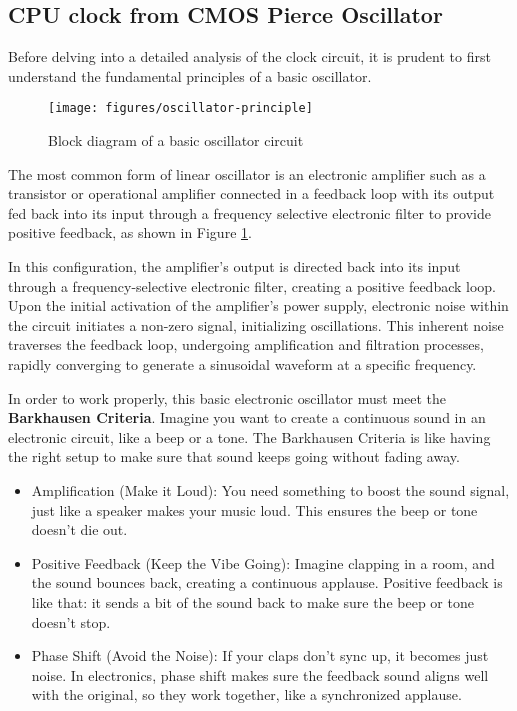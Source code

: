 \subsection{CPU clock from CMOS Pierce Oscillator}

Before delving into a detailed analysis of the clock circuit, it is prudent to first understand the fundamental principles of a basic oscillator. 

\begin{figure}[h]
  \centering
  \texttt{[image: figures/oscillator-principle]}
  \caption{Block diagram of a basic oscillator circuit}
  \label{fig:oscillator-principle}
\end{figure}

The most common form of linear oscillator is an electronic amplifier such as a transistor or operational amplifier connected in a feedback loop with its output fed back into its input through a frequency selective electronic filter to provide positive feedback, as shown in Figure \ref{fig:oscillator-principle}. 

In this configuration, the amplifier's output is directed back into its input through a frequency-selective electronic filter, creating a positive feedback loop. Upon the initial activation of the amplifier's power supply, electronic noise within the circuit initiates a non-zero signal, initializing oscillations. This inherent noise traverses the feedback loop, undergoing amplification and filtration processes, rapidly converging to generate a sinusoidal waveform at a specific frequency.

In order to work properly, this basic electronic oscillator must meet the {\bf Barkhausen Criteria}. Imagine you want to create a continuous sound in an electronic circuit, like a beep or a tone. The Barkhausen Criteria is like having the right setup to make sure that sound keeps going without fading away.

\begin{itemize}
  \item Amplification (Make it Loud): You need something to boost the sound signal, just like a speaker makes your music loud. This ensures the beep or tone doesn't die out.
  
  \item Positive Feedback (Keep the Vibe Going): Imagine clapping in a room, and the sound bounces back, creating a continuous applause. Positive feedback is like that: it sends a bit of the sound back to make sure the beep or tone doesn't stop.
  
  \item Phase Shift (Avoid the Noise): If your claps don't sync up, it becomes just noise. In electronics, phase shift makes sure the feedback sound aligns well with the original, so they work together, like a synchronized applause.
\end{itemize}
  
